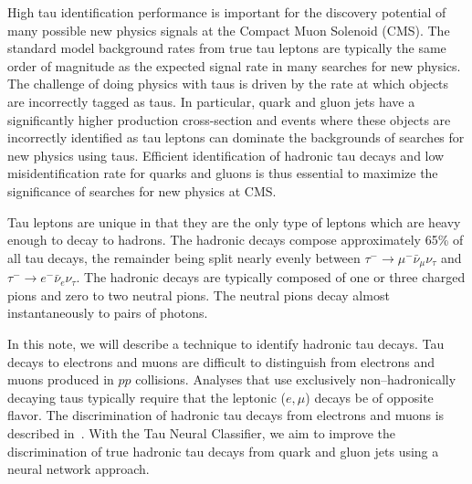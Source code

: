 High tau identification performance is important for the discovery potential of
many possible new physics signals at the Compact Muon Solenoid (CMS).  The
standard model background rates from true tau leptons are typically the same
order of magnitude as the expected signal rate in many searches for new
physics.  The challenge of doing physics with taus is driven by the rate at
which objects are incorrectly tagged as taus.  In particular, quark and gluon
jets have a significantly higher production cross-section and events where
these objects are incorrectly identified as tau leptons can dominate the
backgrounds of searches for new physics using taus.  Efficient identification
of hadronic tau decays and low misidentification rate for quarks and gluons
is thus essential to maximize the significance of searches for new physics at
CMS.



Tau leptons are unique in that they are the only type of leptons which are heavy
enough to decay to hadrons.  The hadronic decays compose approximately 65\% of
all tau decays, the remainder being split nearly evenly between $\tau^{-}
\rightarrow \mu^{-} \bar \nu_\mu \nu_\tau$ and $\tau^{-} \rightarrow e^{-} \bar
\nu_e \nu_\tau$.  The hadronic decays are typically composed of one or three charged
pions and zero to two neutral pions.  The neutral pions decay almost
instantaneously to pairs of photons.

In this note, we will describe a technique to identify hadronic tau decays.  Tau
decays to electrons and muons are difficult to distinguish from electrons and
muons produced in $pp$ collisions.  Analyses that use exclusively
non--hadronically decaying taus typically require that the leptonic ($e,\mu$)
decays be of opposite flavor.  The discrimination of hadronic tau decays from
electrons and muons is described in~\cite{CMS-PAS-PFT-08-001}. With the Tau Neural
Classifier, we aim to improve the discrimination of true hadronic tau decays
from quark and gluon jets using a neural network approach.

